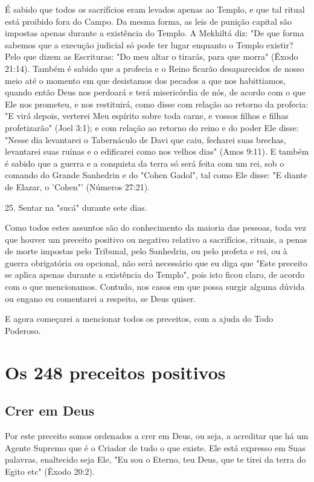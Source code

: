 \begin{itemize}
\begin{enumrate}
\begin{itemize}
É sabido que todos os sacrifícios eram levados apenas ao Templo, e que
tal ritual está proibido fora do Campo. Da mesma forma, as leis de
puni­ção capital são impostas apenas durante a existência do Templo. A
Mekhiltá diz: "De que forma sabemos que a execução judicial só pode ter
lugar enquanto o Templo existir? Pelo que dizem as Escrituras: "Do meu
altar o tirarás, para que morra" (Êxodo 21:14). Também é sabido que a
profecia e o Reino ficarão desaparecidos de nosso meio até o momento em
que desistamos dos pecados a que nos habittiamos, quando então Deus nos
perdoará e terá misericórdia de nós, de acordo com o que Ele nos
prometeu, e nos restituirá, como disse com relação ao retorno da
profecia: "E virá depois, verterei Meu espírito sobre toda carne, e
vossos filhos e filhas profetizarão" (Joel 3:1); e com relação ao
retorno do reino e do poder Ele disse: "Nesse dia levantarei o
Tabernáculo de Davi que caiu, fecharei suas brechas, levantarei suas
ruínas e o edificarei como nos ve­lhos dias" (Amos 9:11). E também é
sabido que a guerra e a conquista da terra só será feita com um rei, sob
o comando do Grande Sanhedrin e do "Cohen Gadol", tal como Ele disse: "E
diante de Elazar, o 'Cohen"' (Números 27:21).

25. Sentar na "sucá" durante sete dias.

Como todos estes assuntos são do conhecimento da maioria das pes­soas,
toda vez que houver um preceito positivo ou negativo relativo a
sacrifí­cios, rituais, a penas de morte impostas pelo Tribunal, pelo
Sanhedrin, ou pelo profeta e rei, ou à guerra obrigatória ou opcional,
não será necessário que eu diga que "Este preceito se aplica apenas
durante a existência do Templo", pois isto ficou claro, de acordo com o
que mencionamos. Contudo, nos casos em que possa surgir alguma dúvida ou
engano eu comentarei a respeito, se Deus quiser.

E agora começarei a mencionar todos os preceitos, com a ajuda do Todo
Poderoso.




\chapter{Os 248 preceitos positivos}

\section{Crer em Deus} %

Por este preceito somos ordenados a crer em Deus, ou seja, a acredi­tar
que há um Agente Supremo que é o Criador de tudo o que existe. Ele está
expresso em Suas palavras, enaltecido seja Ele, "Eu sou o Eterno, teu
Deus, que te tirei da terra do Egito etc" (Êxodo 20:2).


\end{itemize}
\end{enumrate}
\end{itemize}
